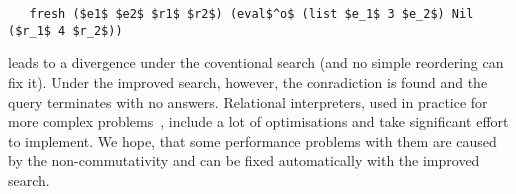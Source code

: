 \begin{lstlisting}
   fresh ($e1$ $e2$ $r1$ $r2$) (eval$^o$ (list $e_1$ 3 $e_2$) Nil ($r_1$ 4 $r_2$))
\end{lstlisting}

\noindent leads to a divergence under the coventional search (and no simple reordering can fix it). 
Under the improved search, however, the conradiction is found and  the query terminates with
no answers. Relational interpreters, used in practice for more complex problems~\cite{unified}, 
include a lot of optimisations and take significant effort to implement. We hope, that some 
performance problems with them are caused by the non-commutativity and can be fixed automatically 
with the improved search.
